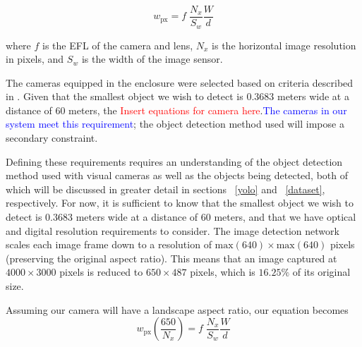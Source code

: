 \documentclass{erauthesis}
\begin{document}
\begin{equation}
w_{\text{px}} = f \; \frac{N_x}{S_w}\frac{W}{d}
\end{equation}

where $f$ is the \ac{EFL} of the camera and lens, $N_x$ is the horizontal image resolution in pixels, and $S_w$ is the width of the image sensor. 

The cameras equipped in the enclosure were selected based on criteria described in \cite{thompson2023}.
Given that the smallest object we wish to detect is $0.3683$ meters wide at a distance of 60 meters, the \textcolor{red}{Insert equations for camera here}.\textcolor{blue}{The cameras in our system meet this requirement}; the object detection method used will impose a secondary constraint.


Defining these requirements requires an understanding of the object detection method used with visual cameras as well as the objects being detected, both of which will be discussed in greater detail in sections ~\ref{yolo} and ~\ref{dataset}, respectively.
For now, it is sufficient to know that the smallest object we wish to detect is $0.3683$ meters wide at a distance of 60 meters, and that we have optical and digital resolution requirements to consider.
The image detection network scales each image frame down to a resolution of $\text{max}(640) \times \text{max}(640)$ pixels (preserving the original aspect ratio).
This means that an image captured at $4000 \times 3000$ pixels is reduced to $650 \times 487$ pixels, which is $16.25\%$ of its original size. 

Assuming our camera will have a landscape aspect ratio, our equation becomes 
\begin{equation}
 w_{\text{px}} \left(\frac{650}{N_x}\right) = f \; \frac{N_x}{S_w}\frac{W}{d}
\end{equation}
\end{document}
